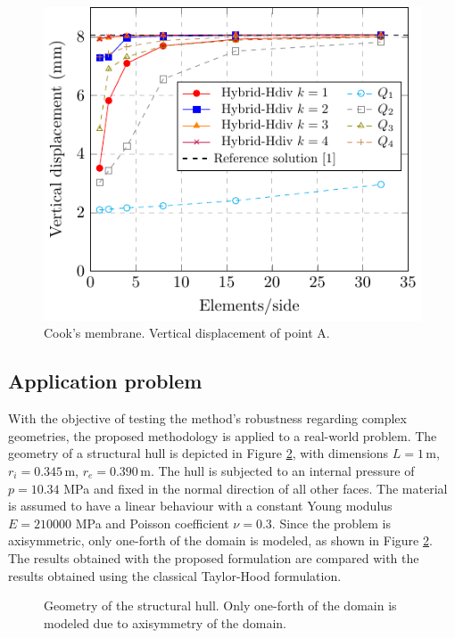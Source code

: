 \documentclass[english,11pt,3p,number,sort&compress]{elsarticle}
\newcommand{\m}{\,\text{m}}
\begin{document}
\begin{figure}[H]
	\centering
	\includegraphics[scale=1.0]{cook-2d-disp-0.4999}
	\caption{Cook's membrane. Vertical displacement of point A.}
	\label{fig:cooks-2d-displacement}
\end{figure}

\subsection{Application problem\label{subsec:module}}

With the objective of testing the method's robustness regarding complex geometries, the proposed methodology is applied to a real-world problem. The geometry of a structural hull is depicted in Figure \ref{fig:module-geometry}, with dimensions $L=1\m$, $r_i=0.345\m$, $r_e=0.390\m$. The hull is subjected to an internal pressure of $p=10.34$ MPa and fixed in the normal direction of all other faces. The material is assumed to have a linear behaviour with a constant Young modulus $E=210000$ MPa and Poisson coefficient $\nu=0.3$. Since the problem is axisymmetric, only one-forth of the domain is modeled, as shown in Figure \ref{fig:module-geometry}. The results obtained with the proposed formulation are compared with the results obtained using the classical Taylor-Hood formulation.

\begin{figure}[h]
    \centering
    \def\svgwidth{450pt} 
    
    \caption{Geometry of the structural hull. Only one-forth of the domain is modeled due to axisymmetry of the domain.}
    \label{fig:module-geometry}
\end{figure}
\end{document}

